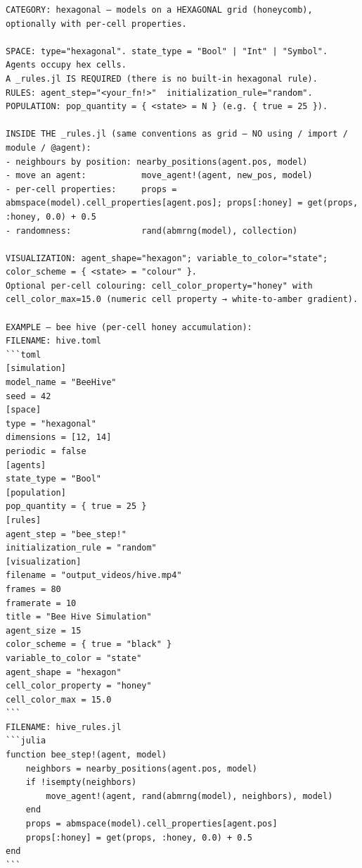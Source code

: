 \documentclass[runningheads]{llncs}
\begin{document}
\begin{lstlisting}[style=cellprompt]
CATEGORY: hexagonal — models on a HEXAGONAL grid (honeycomb), optionally with per-cell properties.

SPACE: type="hexagonal". state_type = "Bool" | "Int" | "Symbol". Agents occupy hex cells.
A _rules.jl IS REQUIRED (there is no built-in hexagonal rule).
RULES: agent_step="<your_fn!>"  initialization_rule="random".
POPULATION: pop_quantity = { <state> = N } (e.g. { true = 25 }).

INSIDE THE _rules.jl (same conventions as grid — NO using / import / module / @agent):
- neighbours by position: nearby_positions(agent.pos, model)
- move an agent:           move_agent!(agent, new_pos, model)
- per-cell properties:     props = abmspace(model).cell_properties[agent.pos]; props[:honey] = get(props, :honey, 0.0) + 0.5
- randomness:              rand(abmrng(model), collection)

VISUALIZATION: agent_shape="hexagon"; variable_to_color="state"; color_scheme = { <state> = "colour" }.
Optional per-cell colouring: cell_color_property="honey" with cell_color_max=15.0 (numeric cell property → white-to-amber gradient).

EXAMPLE — bee hive (per-cell honey accumulation):
FILENAME: hive.toml
```toml
[simulation]
model_name = "BeeHive"
seed = 42
[space]
type = "hexagonal"
dimensions = [12, 14]
periodic = false
[agents]
state_type = "Bool"
[population]
pop_quantity = { true = 25 }
[rules]
agent_step = "bee_step!"
initialization_rule = "random"
[visualization]
filename = "output_videos/hive.mp4"
frames = 80
framerate = 10
title = "Bee Hive Simulation"
agent_size = 15
color_scheme = { true = "black" }
variable_to_color = "state"
agent_shape = "hexagon"
cell_color_property = "honey"
cell_color_max = 15.0
```
FILENAME: hive_rules.jl
```julia
function bee_step!(agent, model)
    neighbors = nearby_positions(agent.pos, model)
    if !isempty(neighbors)
        move_agent!(agent, rand(abmrng(model), neighbors), model)
    end
    props = abmspace(model).cell_properties[agent.pos]
    props[:honey] = get(props, :honey, 0.0) + 0.5
end
```
\end{lstlisting}
\end{document}
